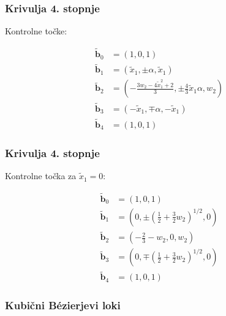 \documentclass[a4paper, 12pt]{beamer}
\theoremstyle{definition}
\theoremstyle{plain}
\begin{document}
    

\begin{frame}
\frametitle{Krivulja 4. stopnje} 
    Kontrolne točke:
 
        \begin{align*}
            \boldsymbol{\tilde{b}}_0 &= (1,0,1) \\
            \boldsymbol{\tilde{b}}_1 &= (\tilde{x}_1,\pm\alpha,\tilde{x}_1) \\
            \boldsymbol{\tilde{b}}_2 &= (-\frac{3w_2-4\tilde{x}_1^2+2}{3},\pm\frac{4}{3}\tilde{x}_1\alpha,w_2) \\
            \boldsymbol{\tilde{b}}_3 &= (-\tilde{x}_1,\mp\alpha,-\tilde{x}_1) \\
            \boldsymbol{\tilde{b}}_4 &= (1,0,1)
        \end{align*}

   
   
\end{frame}


\begin{frame}
\frametitle{Krivulja 4. stopnje}
    Kontrolne točka za $\tilde{x}_1=0$:

        \begin{align*}
            \boldsymbol{\tilde{b}}_0 &= (1,0,1) \\
            \boldsymbol{\tilde{b}}_1 &= (0,\pm (\frac{1}{2}+\frac{3}{2}w_2)^{1/2},0) \\
            \boldsymbol{\tilde{b}}_2 &= (-\frac{2}{3}-w_2,0,w_2) \\
            \boldsymbol{\tilde{b}}_3 &= (0,\mp(\frac{1}{2}+\frac{3}{2}w_2)^{1/2},0) \\
            \boldsymbol{\tilde{b}}_4 &= (1,0,1)
        \end{align*}
  
    
\end{frame}
    
    

\begin{frame}
    \frametitle{Kubični B\'ezierjevi loki}


\end{frame}

\end{document}
